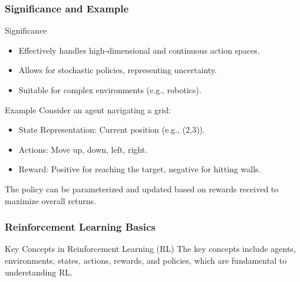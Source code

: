 \documentclass{beamer}
\begin{document}
\begin{frame}[fragile]
    \frametitle{Significance and Example}
    
    \begin{block}{Significance}
        \begin{itemize}
            \item Effectively handles high-dimensional and continuous action spaces.
            \item Allows for stochastic policies, representing uncertainty.
            \item Suitable for complex environments (e.g., robotics).
        \end{itemize}
    \end{block}
    
    \begin{block}{Example}
        Consider an agent navigating a grid:
        \begin{itemize}
            \item State Representation: Current position (e.g., (2,3)).
            \item Actions: Move up, down, left, right.
            \item Reward: Positive for reaching the target, negative for hitting walls.
        \end{itemize}
        The policy can be parameterized and updated based on rewards received to maximize overall returns.
    \end{block}
\end{frame}

\begin{frame}[fragile]
    \frametitle{Reinforcement Learning Basics}
    \begin{block}{Key Concepts in Reinforcement Learning (RL)}
        The key concepts include agents, environments, states, actions, rewards, and policies, which are fundamental to understanding RL.
    \end{block}
\end{frame}
\end{document}
